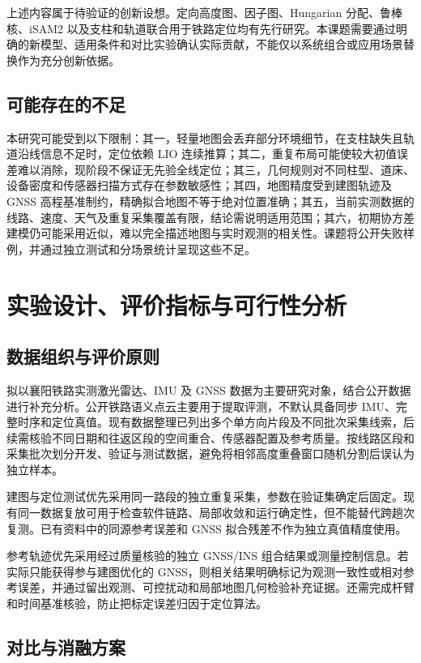 \documentclass[UTF8,a4paper,12pt,fontset=fandol]{ctexart}
\begin{document}
上述内容属于待验证的创新设想。定向高度图、因子图、Hungarian 分配、鲁棒核、iSAM2 以及支柱和轨道联合用于铁路定位均有先行研究。本课题需要通过明确的新模型、适用条件和对比实验确认实际贡献，不能仅以系统组合或应用场景替换作为充分创新依据。

\subsection{可能存在的不足}

本研究可能受到以下限制：其一，轻量地图会丢弃部分环境细节，在支柱缺失且轨道沿线信息不足时，定位依赖 LIO 连续推算；其二，重复布局可能使较大初值误差难以消除，现阶段不保证无先验全线定位；其三，几何规则对不同柱型、道床、设备密度和传感器扫描方式存在参数敏感性；其四，地图精度受到建图轨迹及 GNSS 高程基准制约，精确拟合地图不等于绝对位置准确；其五，当前实测数据的线路、速度、天气及重复采集覆盖有限，结论需说明适用范围；其六，初期协方差建模仍可能采用近似，难以完全描述地图与实时观测的相关性。课题将公开失败样例，并通过独立测试和分场景统计呈现这些不足。

\section{实验设计、评价指标与可行性分析}

\subsection{数据组织与评价原则}

拟以襄阳铁路实测激光雷达、IMU 及 GNSS 数据为主要研究对象，结合公开数据进行补充分析。公开铁路语义点云主要用于提取评测，不默认具备同步 IMU、完整时序和定位真值。现有数据整理已列出多个单方向片段及不同批次采集线索，后续需核验不同日期和往返区段的空间重合、传感器配置及参考质量。按线路区段和采集批次划分开发、验证与测试数据，避免将相邻高度重叠窗口随机分割后误认为独立样本。

建图与定位测试优先采用同一路段的独立重复采集，参数在验证集确定后固定。现有同一数据复放可用于检查软件链路、局部收敛和运行确定性，但不能替代跨趟次复测。已有资料中的同源参考误差和 GNSS 拟合残差不作为独立真值精度使用。

参考轨迹优先采用经过质量核验的独立 GNSS/INS 组合结果或测量控制信息。若实际只能获得参与建图优化的 GNSS，则相关结果明确标记为观测一致性或相对参考误差，并通过留出观测、可控扰动和局部地图几何检验补充证据。还需完成杆臂和时间基准核验，防止把标定误差归因于定位算法。

\subsection{对比与消融方案}
\end{document}
